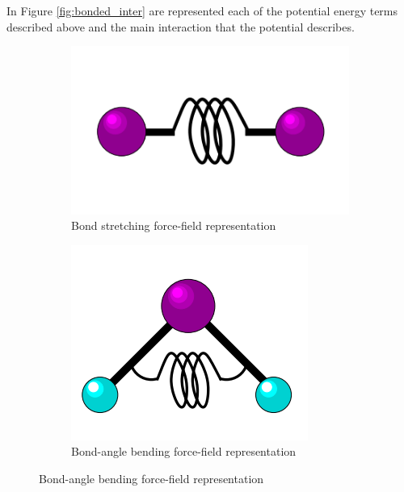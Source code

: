 In Figure \ref{fig:bonded_inter} are represented each of the potential energy terms described above and the main interaction that the potential describes.

\begin{figure}[ht]

    \centering
    \begin{subfigure}[t]{0.25\textwidth}
    \includegraphics[width=\textwidth]{Figures/Chapter2/bond.png}
    \caption{Bond stretching force-field representation}
    \label{fig:bond}
    \end{subfigure}
    \hspace{1cm}
    \begin{subfigure}[t]{0.25\textwidth}
    \includegraphics[width=\textwidth]{Figures/Chapter2/angle.png}
    \caption{Bond-angle bending force-field representation}
    \label{fig:angle}
    \end{subfigure}
    

\end{figure}
